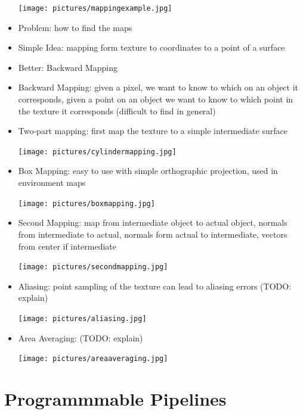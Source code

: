 \documentclass[11pt,a4paper]{article}
\begin{document}
\begin{itemize}
		\begin{center}
			\texttt{[image: pictures/mappingexample.jpg]}
		\end{center}
		\item Problem: how to find the maps
		\item Simple Idea: mapping form texture to coordinates to a point of a surface
		\item Better: Backward Mapping
		\item Backward Mapping: given a pixel, we want to know to which on an object it corresponds, given a point on an object we want to know to which point in the texture it corresponds (difficult to find in general)
		\item Two-part mapping: first map the texture to a simple intermediate surface
		\begin{center}
			\texttt{[image: pictures/cylindermapping.jpg]}
		\end{center}
		\item Box Mapping: easy to use with simple orthographic projection, used in environment maps
		\begin{center}
			\texttt{[image: pictures/boxmapping.jpg]}
		\end{center}
		\item Second Mapping: map from intermediate object to actual object, normals from intermediate to actual, normals form actual to intermediate, vectors from center if intermediate
		\begin{center}
			\texttt{[image: pictures/secondmapping.jpg]}
		\end{center}
		\item Aliasing: point sampling of the texture can lead to aliasing errors (TODO: explain)
		\begin{center}
			\texttt{[image: pictures/aliasing.jpg]}
		\end{center}
		\item Area Averaging: (TODO: explain)
		\begin{center}
			\texttt{[image: pictures/areaaveraging.jpg]}
		\end{center}
	\end{itemize}

\section{Programmmable Pipelines}
\end{document}
